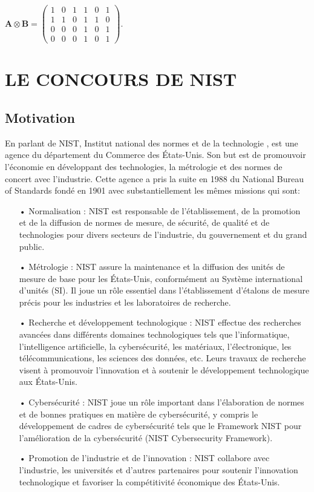 \documentclass[12pt,openany]{report}
\begin{document}
$ \mathbf{A}\otimes \mathbf{B} = 
\begin{pmatrix}
1&0&1&1&0&1\\
1&1&0&1&1&0\\
0&0&0&1&0&1\\
0&0&0&1&0&1
\end{pmatrix}
  $.




\chapter{LE CONCOURS DE NIST}
\minitoc
\newpage
   
\section{Motivation}


 En parlant de NIST, Institut national des normes et de la technologie , est une agence du département du Commerce des États-Unis. Son but est de promouvoir l'économie en développant des technologies, la métrologie et des normes de concert avec l'industrie. Cette agence a pris la suite en 1988 du National Bureau of Standards fondé en 1901 avec substantiellement les mêmes missions qui sont:
\begin{itemize}
\item[•] Normalisation : NIST est responsable de l'établissement, de la promotion et de la diffusion de normes de mesure, de sécurité, de qualité et de technologies pour divers secteurs de l'industrie, du gouvernement et du grand public.
\item[•] Métrologie : NIST assure la maintenance et la diffusion des unités de mesure de base pour les États-Unis, conformément au Système international d'unités (SI). Il joue un rôle essentiel dans l'établissement d'étalons de mesure précis pour les industries et les laboratoires de recherche.
\item[•] Recherche et développement technologique : NIST effectue des recherches avancées dans différents domaines technologiques tels que l'informatique, l'intelligence artificielle, la cybersécurité, les matériaux, l'électronique, les télécommunications, les sciences des données, etc. Leurs travaux de recherche visent à promouvoir l'innovation et à soutenir le développement technologique aux États-Unis.
\item[•] Cybersécurité : NIST joue un rôle important dans l'élaboration de normes et de bonnes pratiques en matière de cybersécurité, y compris le développement de cadres de cybersécurité tels que le Framework NIST pour l'amélioration de la cybersécurité (NIST Cybersecurity Framework).
\item[•] Promotion de l'industrie et de l'innovation : NIST collabore avec l'industrie, les universités et d'autres partenaires pour soutenir l'innovation technologique et favoriser la compétitivité économique des États-Unis.\cite{ANSSI}

\end{itemize}
\end{document}

